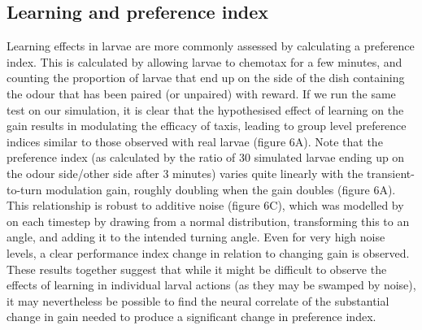 \documentclass[10pt,a4paper]{article}
\begin{document}
\subsection{Learning and preference index}
Learning effects in larvae are more commonly assessed by calculating a preference index. This is calculated by allowing larvae to chemotax for a few minutes, and counting the proportion of larvae that end up on the side of the dish containing the odour that has been paired (or unpaired) with reward. If we run the same test on our simulation, it is clear that the hypothesised effect of learning on the gain results in modulating the efficacy of taxis, leading to group level preference indices similar to those observed with real larvae (figure 6A). Note that the preference index (as calculated by the ratio of 30 simulated larvae ending up on the odour side/other side after 3 minutes) varies quite linearly with the transient-to-turn modulation gain, roughly doubling when the gain doubles (figure 6A). This relationship is robust to additive noise (figure 6C), which was modelled by on each timestep by drawing from a normal distribution, transforming this to an angle, and adding it to the intended turning angle. Even for very high noise levels, a clear performance index change in relation to changing gain is observed. These results together suggest that while it might be difficult to observe the effects of learning in individual larval actions (as they may be swamped by noise), it may nevertheless be possible to find the neural correlate of the substantial change in gain needed to produce a significant change in preference index.
\end{document}
